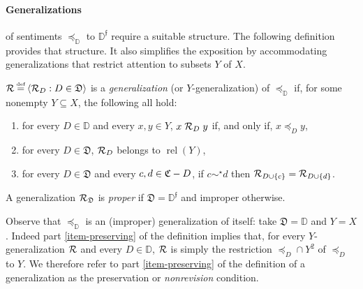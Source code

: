 \documentclass[12pt,a4paper,twoside]{article}
\newcommand{\relations}{\operatorname{rel}}
\newcommand{\novel}{\mathfrak f}
\newcommand{\precsimb}{\mathbin{\preceq}}
\newcommand{\preceqb}{\mathbin{\preceq}}
\newcommand{\ext}{\mathrel{\mc R}}
\newcommand{\extb}{\mathbin{\mc R}}
\newcommand{\mbbd}{{\mathds D}}
\newcommand{\mbbdp}{{\mathds D^{\novel}}}
\newcommand{\dpp}{{\mathfrak D}}
\newcommand{\cpp}{{\mathfrak C}}
\begin{document}
\paragraph{Generalizations}\hskip-5pt of sentiments $\precsimb_\mbbd$ to
$\mbbdp$ require a suitable structure. The following definition provides that
structure. It also simplifies the exposition by accommodating generalizations
that restrict attention to subsets $Y$ of $X$.
\begin{definition}\label{def-{generalization}} $\extb \defeq \langle \extb_{D}:
  D\in \dpp \rangle$ is a \emph{{generalization}} (or $Y$-{generalization}) of
  $\preceq_{\mbbd}$ if, for some nonempty $Y \subseteq X$, the following all
  hold$:$

\begin{enumerate}%

\item \label{item-preserving} for every $D \in \mbbd$ and every $x,y\in Y$,
  $x \ext_{D} y$ if, and only if, $x \preceq_{D} y$,

\item\label{item-binary-rel} for every $D\in \dpp$, $\ext_{D}$ belongs
  to $\relations (Y)$,

\item \label{item-dimension} for every $D\in \dpp$ and %
every $c,d \in \cpp\bs D$,  if $c \sim ^ \star d$ then
  $\extb _ { D \cup \{c\} } = \extb _ { D \cup \{d\}}$.

\end{enumerate}
A {generalization} $\ext_{\dpp}$ is \emph{proper} if $\dpp = \mbbdp$ and improper
  otherwise.
\end{definition}
 Observe that $\preceq_\mbbd$ is an (improper)
{generalization} of itself: take $\dpp = \mbbd$ and $Y = X$.
Indeed part \ref{item-preserving} of the definition implies that, for every
$Y$-{generalization} $\ext$ and every $D\in \mbbd$, $\ext$ is simply the restriction
$\preceqb_{D}\cap Y^{2}$ of $\preceq_{D}$ to $Y$.  We therefore refer to part
\ref{item-preserving} of the definition of a {generalization} as the preservation or
\emph{nonrevision} condition.
\end{document}
